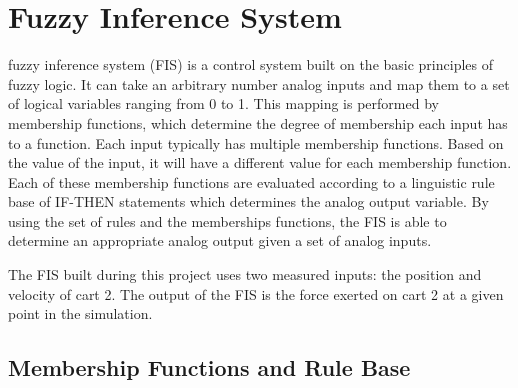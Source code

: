 \documentclass[submit]{aiaa-tc}%
\begin{document}
\section{Fuzzy Inference System}
 fuzzy inference system (FIS) is a control system built on the basic principles of fuzzy logic\cite{kosko:91bk}\cite{kosko:93sciam}. It can take an arbitrary number analog inputs and map them to a set of logical variables ranging from 0 to 1. This mapping is performed by membership functions, which determine the degree of membership each input has to a function. Each input typically has multiple membership functions. Based on the value of the input, it will have a different value for each membership function. Each of these membership functions are evaluated according to a linguistic rule base of IF-THEN statements which determines the analog output variable. By using the set of rules and the memberships functions, the FIS is able to determine an appropriate analog output given a set of analog inputs.

The FIS built during this project uses two measured inputs: the position and velocity of cart 2. The output of the FIS is the force exerted on cart 2 at a given point in the simulation.

\subsection{Membership Functions and Rule Base}
\end{document}
